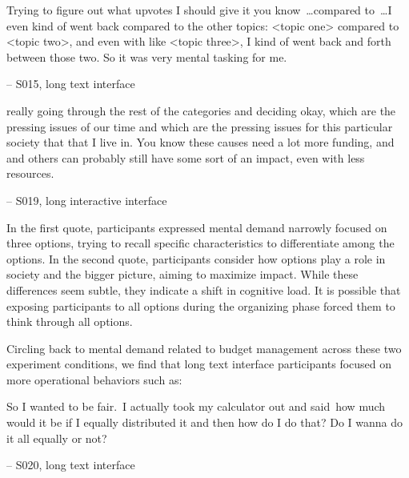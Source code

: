 
\begin{displayquote}
Trying to figure out what upvotes I should give it you know~\ldots compared to~\ldots I even kind of went back compared to the other topics: <topic one> compared to <topic two>, and even with like <topic three>, I kind of went back and forth between those two. \bracketellipsis So it was very mental tasking for me.

\noindent \hfill -- S015, long text interface
\end{displayquote}

    

\begin{displayquote}
\bracketellipsis really going through the rest of the categories and deciding okay, which are the pressing issues of our time and which are the pressing issues for this particular society that that I live in. \bracketellipsis You know these causes need a lot more funding, and and others can probably still have some sort of an impact, even with less resources.

\noindent \hfill -- S019, long interactive interface
\end{displayquote}

In the first quote, participants expressed mental demand narrowly focused on three options, trying to recall specific characteristics to differentiate among the options. In the second quote, participants consider how options play a role in society and the bigger picture, aiming to maximize impact. While these differences seem subtle, they indicate a shift in cognitive load. It is possible that exposing participants to all options during the organizing phase forced them to think through all options.

Circling back to mental demand related to budget management across these two experiment conditions, we find that long text interface participants focused on more operational behaviors such as:

\begin{displayquote}
So I wanted to be fair.~\bracketellipsis I actually took my calculator out and said~\bracketellipsis  how much would it be if I equally distributed it and then how do I do that? Do I wanna do it all equally or not?

\noindent \hfill -- S020, long text interface
\end{displayquote}

